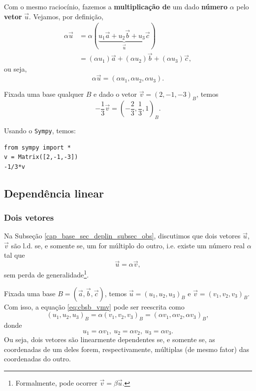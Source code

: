 Com o mesmo raciocínio, fazemos a {\bf multiplicação de} um dado {\bf número} $\alpha$ pelo {\bf vetor} $\vec{u}$. Vejamos, por definição,
\begin{align}
  \alpha\vec{u} &= \alpha(\underbrace{u_1\vec{a} + u_2\vec{b} + u_3\vec{c}}_{\vec{u}})\\
                &= (\alpha u_1)\vec{a} + (\alpha u_2)\vec{b} + (\alpha u_3)\vec{c},
\end{align}
ou seja,
\begin{equation}
  \alpha\vec{u} = (\alpha u_1,\alpha u_2, \alpha u_3).
\end{equation}

\begin{ex}
  Fixada uma base qualquer $B$ e dado o vetor $\vec{v} = (2, -1, -3)_B$, temos
  \begin{equation}
    -\frac{1}{3}\vec{v} = \left(-\frac{2}{3}, \frac{1}{3}, 1\right)_B.
  \end{equation}

    \ifispython
  Usando o \verb+Sympy+, temos:
\begin{verbatim}
from sympy import *
v = Matrix([2,-1,-3])
-1/3*v
\end{verbatim}
  \fi

\end{ex}

\subsection{Dependência linear}\label{cap_base_sec_base_subsec_dl}

\subsubsection{Dois vetores}

Na Subseção \ref{cap_base_sec_deplin_subsec_obs}, discutimos que dois vetores $\vec{u}$, $\vec{v}$ são l.d. se, e somente se, um for múltiplo do outro, i.e. existe um número real $\alpha$ tal que
\begin{equation}\label{eq:cbsb_vmv}
  \vec{u} = \alpha\vec{v},
\end{equation}
sem perda de generalidade\footnote{Formalmente, pode ocorrer $\vec{v} = \beta\vec{u}$.}.

Fixada uma base $B = (\vec{a}, \vec{b}, \vec{c})$, temos $\vec{u} = (u_1, u_2, u_3)_B$ e $\vec{v} = (v_1, v_2, v_3)_B$. Com isso, a equação \eqref{eq:cbsb_vmv} pode ser reescrita como
\begin{equation}
  (u_1, u_2, u_3)_B = \alpha(v_1, v_2, v_3)_B = (\alpha v_1, \alpha v_2, \alpha v_3)_B,
\end{equation}
donde
\begin{equation}
  u_1 = \alpha v_1,~u_2 = \alpha v_2,~u_3 = \alpha v_3.
\end{equation}
Ou seja, dois vetores são linearmente dependentes se, e somente se, as coordenadas de um deles forem, respectivamente, múltiplas (de mesmo fator) das coordenadas do outro.


